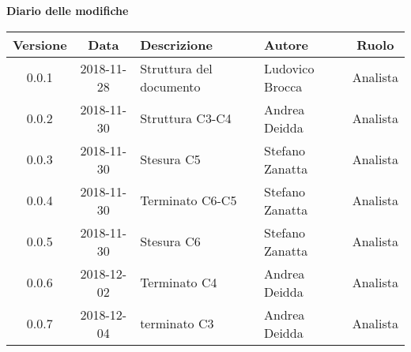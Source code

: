 \begin{center}
		\textbf{Diario delle modifiche}
	\end{center}
	\begin{center}
		\begin{tabularx}{\textwidth}{|c|c|X|X|c|}
			\hline
			\textbf{Versione} & \textbf{Data} & \textbf{Descrizione} & \textbf{Autore} & \textbf{Ruolo} \\
			\hline 
			0.0.1 &  2018-11-28& Struttura del documento & Ludovico Brocca & Analista\\
			\hline
			0.0.2 & 2018-11-30 & Struttura C3-C4 & Andrea Deidda & Analista \\
			\hline
			0.0.3 & 2018-11-30 & Stesura C5 & Stefano Zanatta & Analista \\
			\hline
			0.0.4 & 2018-11-30 & Terminato C6-C5 & Stefano Zanatta & Analista \\
			\hline
			0.0.5 & 2018-11-30 & Stesura C6 & Stefano Zanatta & Analista \\
			\hline
			0.0.6 & 2018-12-02 & Terminato C4 & Andrea Deidda & Analista \\
			\hline
			0.0.7 &  2018-12-04 & terminato C3 & Andrea Deidda & Analista \\
			\hline
		\end{tabularx}
	\end{center}
\newpage